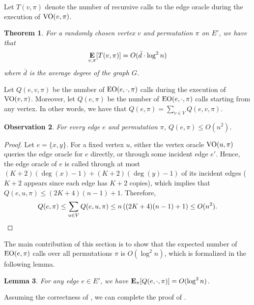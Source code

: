 \documentclass[letterpaper,11pt]{article}
\DeclareMathOperator{\E}{\ensuremath{\normalfont \textbf{E}}}
\newcommand{\VO}[0]{\ensuremath{\textup{VO}}}
\newcommand{\EO}[0]{\ensuremath{\textup{EO}}}
\newtheorem{theorem}{Theorem}[section]
\newtheorem{lemma}[theorem]{Lemma}
\newtheorem{observation}[theorem]{Observation}
\newenvironment{myproof}{
\vspace{-0.5cm}
\begin{proof}
}{
\end{proof}
}
\begin{document}
Let $T(v, \pi)$ denote the number of recursive calls to the edge oracle during the execution of $\VO(v, \pi)$.

\begin{theorem}\label{thm: query-complexity}
For a randomly chosen vertex $v$ and permutation $\pi$ on $E'$, we have that
\begin{align*}
    \E_{v, \pi}[T(v,\pi)] = O(\bar{d}\cdot \log^2 n)
\end{align*}
where $\bar{d}$ is the average degree of the graph $G$.
\end{theorem}

Let $Q(e, v, \pi)$ be the number of $\EO(e, \cdot, \pi)$ calls during the execution of $\VO(v, \pi)$. Moreover, let $Q(e, \pi)$ be the number of $\EO(e, \cdot, \pi)$ calls starting from any vertex. In other words, we have that $Q(e, \pi) = \sum_{v\in V}Q(e, v, \pi)$. 


\begin{observation}\label{obs: q-upperbound}
For every edge $e$ and permutation $\pi$, $Q(e, \pi) \leq O(n^2)$.
\end{observation}
\begin{myproof}
Let $e = \{x,y\}$. For a fixed vertex $u$, either the vertex oracle $\VO(u, \pi)$ queries the edge oracle for $e$ directly, or through some incident edge $e'$. Hence, the edge oracle of $e$ is called through at most $(K + 2)(\deg(x) - 1) + (K + 2)(\deg(y) - 1)$ of its incident edges ($K+2$ appears since each edge has $K + 2$ copies), which implies that $Q(e, u, \pi) \leq (2K + 4)(n - 1) + 1$. Therefore,
\begin{align*}
    Q(e, \pi) \leq \sum_{u\in V} Q(e, u, \pi) \leq n\left( (2K + 4)(n - 1) + 1 \right) \leq O(n^2).\qedhere
\end{align*}
\end{myproof}


The main contribution of this section is to show that the expected number of $\EO(e, \pi)$ calls over all permutations $\pi$ is $O(\log^2 n)$, which is formalized in the following lemma.

\begin{lemma}\label{lem: query-complexity}
For any edge $e \in E'$, we have $\E_\pi[Q(e, \cdot, \pi)] = O(\log^2 n)$.
\end{lemma}

Assuming the correctness of , we can complete the proof of .
\end{document}
